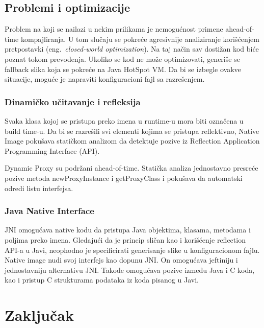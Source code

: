 \documentclass[a4paper]{article}
\begin{document}
\subsection{Problemi i optimizacije}
\label{sec:natImg-proboptim}

Problem na koji se nailazi u nekim prilikama je nemogućnost 
primene ahead-of-time kompajliranja. U tom slučaju se pokreće 
agresivnije analiziranje korišćenjem pretpostavki (eng.~{\em closed-world optimization}). 
Na taj način sav dostižan kod biće poznat tokom prevođenja.
Ukoliko se kod ne može optimizovati, generiše se fallback slika
koja se pokreće na Java HotSpot VM. Da bi se izbegle ovakve situacije,
moguće je napraviti konfiguracioni fajl sa razrešenjem.

\subsubsection{Dinamičko učitavanje i refleksija}
\label{sec:natImg-dynRefl}
Svaka klasa kojoj se pristupa preko imena u runtime-u mora 
biti označena u build time-u.
Da bi se razrešili svi elementi kojima se pristupa reflektivno,
Native Image pokušava statičkom analizom da detektuje pozive 
iz Reflection Application Programming Interface (API).

Dynamic Proxy su podržani ahead-of-time. Statička analiza 
jednostavno presreće pozive metoda newProxyInstance i 
getProxyClass i pokušava da automatski odredi listu interfejsa.

\subsubsection{Java Native Interface}
\label{sec:natImg-jni}
JNI omogućava native kodu da pristupa Java objektima, klasama,
metodama i poljima preko imena. Gledajući da je princip sličan
kao i korišćenje reflection API-a u Javi, neophodno je specificirati
generisanje slike u konfiguracionom fajlu.
Native image nudi svoj interfejs kao dopunu JNI.
On omogućava jeftiniju i jednostavniju alternativu JNI. Takođe
omogućava pozive između Java i C koda, kao i pristup C strukturama
podataka iz koda pisanog u Javi.



\section{Zaključak}
\label{sec:zakljucak}
\end{document}
